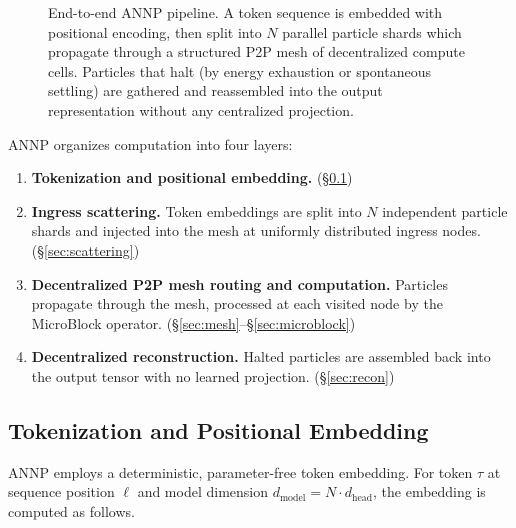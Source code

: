 \documentclass[11pt,a4paper]{article}
\theoremstyle{definition}
\begin{document}
\begin{figure}[ht]
\caption{%
  End-to-end ANNP pipeline.
  A token sequence is embedded with positional encoding, then split into $N$ parallel particle shards
  which propagate through a structured P2P mesh of decentralized compute cells.
  Particles that halt (by energy exhaustion or spontaneous settling) are gathered and reassembled
  into the output representation without any centralized projection.
}
\label{fig:pipeline}
\end{figure}

ANNP organizes computation into four layers:

\begin{enumerate}[leftmargin=2em]
  \item \textbf{Tokenization and positional embedding.} (\S\ref{sec:tokenizer})
  \item \textbf{Ingress scattering.} Token embeddings are split into $N$ independent particle shards
    and injected into the mesh at uniformly distributed ingress nodes. (\S\ref{sec:scattering})
  \item \textbf{Decentralized P2P mesh routing and computation.}
    Particles propagate through the mesh, processed at each visited node by the MicroBlock operator.
    (\S\ref{sec:mesh}--\S\ref{sec:microblock})
  \item \textbf{Decentralized reconstruction.}
    Halted particles are assembled back into the output tensor with no learned projection. (\S\ref{sec:recon})
\end{enumerate}

\subsection{Tokenization and Positional Embedding}
\label{sec:tokenizer}

ANNP employs a deterministic, parameter-free token embedding.
For token $\tau$ at sequence position $\ell$ and model dimension $d_\text{model} = N \cdot d_\text{head}$,
the embedding is computed as follows.
\end{document}
